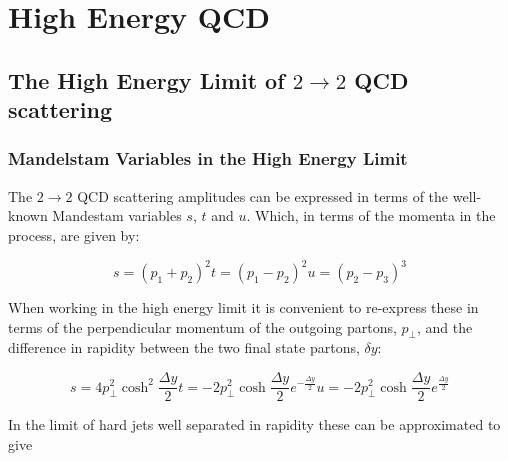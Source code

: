 \chapter{High Energy QCD}
\label{chap:HEP}

\section{The High Energy Limit of $2\rightarrow2$ QCD scattering}

	\subsection{Mandelstam Variables in the High Energy Limit}
	\label{sub:Mandelstam Variables in the High Energy Limit}

	The $2\rightarrow 2$ QCD scattering amplitudes can be expressed in terms of the well-known Mandestam variables $s$, $t$ and $u$.  Which, in terms of the momenta in the process, are given by:

	\begin{subequations}
		\begin{equation}
			s = (p_1 + p_2)^2
		\end{equation}
		\begin{equation}
			t = (p_1 - p_2)^2
		\end{equation}
		\begin{equation}
			u = (p_2 - p_3)^3
		\end{equation}
	\end{subequations}

	When working in the high energy limit it is convenient to re-express these in terms of the perpendicular momentum of the outgoing partons, $p_\perp$, and the difference in rapidity between the two final state partons, $\delta y$:

	\begin{subequations}
		\begin{equation}
			s = 4p_\perp^2 \cosh^2\frac{\Delta y}{2}
		\end{equation}
		\begin{equation}
			t = -2p_\perp^2 \cosh\frac{\Delta y}{2}e^{-\frac{\Delta y}{2}}
		\end{equation}
		\begin{equation}
			u = -2p_\perp^2 \cosh\frac{\Delta y}{2}e^{\frac{\Delta y}{2}}
		\end{equation}
	\end{subequations}

	In the limit of hard jets well separated in rapidity these can be approximated to give

